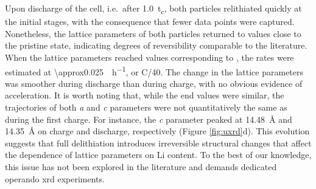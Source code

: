 \documentclass{article}
\begin{document}
Upon discharge of the cell, i.e.\ after \SI{1.0}{t_c}, both particles
relithiated quickly at the initial stages, with the consequence that
fewer data points were captured. Nonetheless, the lattice parameters
of both particles returned to values close to the pristine state,
indicating degrees of reversibility comparable to the
literature\cite{robert2015}. When the lattice parameters reached
values corresponding to , the rates were estimated at
\SI{\approx0.025}{\per\hour}, or C/40. The change in the
lattice parameters was smoother during discharge than during charge,
with no obvious evidence of acceleration. It is worth noting that,
while the end values were similar, the trajectories of both \emph{a}
and \emph{c} parameters were not quantitatively the same as during the
first charge. For instance, the \emph{c} parameter peaked at
\SI{14.48}{\angstrom} and \SI{14.35}{\angstrom} on charge and
discharge, respectively (Figure \ref{fig:uxrd}d). This evolution
suggests that full delithiation introduces irreversible structural
changes that affect the dependence of lattice parameters on Li
content. To the best of our knowledge, this issue has not been
explored in the literature and demands dedicated operando \gls{xrd}
experiments.



\end{document}
